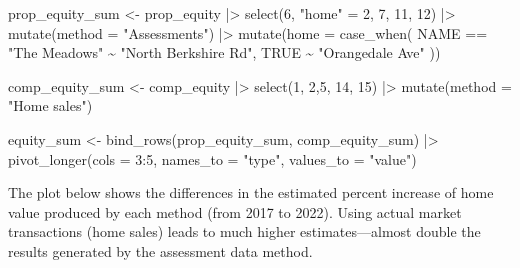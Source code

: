 \documentclass[
  letterpaper,
  DIV=11,
  numbers=noendperiod]{scrartcl}
\newenvironment{Shaded}{\begin{snugshade}}{\end{snugshade}}
\newcommand{\AttributeTok}[1]{\textcolor[rgb]{0.40,0.45,0.13}{#1}}
\newcommand{\ConstantTok}[1]{\textcolor[rgb]{0.56,0.35,0.01}{#1}}
\newcommand{\DecValTok}[1]{\textcolor[rgb]{0.68,0.00,0.00}{#1}}
\newcommand{\FunctionTok}[1]{\textcolor[rgb]{0.28,0.35,0.67}{#1}}
\newcommand{\NormalTok}[1]{\textcolor[rgb]{0.00,0.23,0.31}{#1}}
\newcommand{\OtherTok}[1]{\textcolor[rgb]{0.00,0.23,0.31}{#1}}
\newcommand{\SpecialCharTok}[1]{\textcolor[rgb]{0.37,0.37,0.37}{#1}}
\newcommand{\StringTok}[1]{\textcolor[rgb]{0.13,0.47,0.30}{#1}}
\begin{document}
\begin{Shaded}
\begin{Highlighting}[]
\NormalTok{prop\_equity\_sum }\OtherTok{\textless{}{-}}\NormalTok{ prop\_equity }\SpecialCharTok{|\textgreater{}} 
  \FunctionTok{select}\NormalTok{(}\DecValTok{6}\NormalTok{, }\StringTok{"home"} \OtherTok{=} \DecValTok{2}\NormalTok{, }\DecValTok{7}\NormalTok{, }\DecValTok{11}\NormalTok{, }\DecValTok{12}\NormalTok{) }\SpecialCharTok{|\textgreater{}} 
  \FunctionTok{mutate}\NormalTok{(}\AttributeTok{method =} \StringTok{"Assessments"}\NormalTok{) }\SpecialCharTok{|\textgreater{}} 
  \FunctionTok{mutate}\NormalTok{(}\AttributeTok{home =} \FunctionTok{case\_when}\NormalTok{(}
\NormalTok{    NAME }\SpecialCharTok{==} \StringTok{"The Meadows"} \SpecialCharTok{\textasciitilde{}} \StringTok{"North Berkshire Rd"}\NormalTok{,}
    \ConstantTok{TRUE} \SpecialCharTok{\textasciitilde{}} \StringTok{"Orangedale Ave"}
\NormalTok{  ))}

\NormalTok{comp\_equity\_sum }\OtherTok{\textless{}{-}}\NormalTok{ comp\_equity }\SpecialCharTok{|\textgreater{}} 
  \FunctionTok{select}\NormalTok{(}\DecValTok{1}\NormalTok{, }\DecValTok{2}\NormalTok{,}\DecValTok{5}\NormalTok{, }\DecValTok{14}\NormalTok{, }\DecValTok{15}\NormalTok{) }\SpecialCharTok{|\textgreater{}} 
  \FunctionTok{mutate}\NormalTok{(}\AttributeTok{method =} \StringTok{"Home sales"}\NormalTok{)}

\NormalTok{equity\_sum }\OtherTok{\textless{}{-}} \FunctionTok{bind\_rows}\NormalTok{(prop\_equity\_sum, comp\_equity\_sum) }\SpecialCharTok{|\textgreater{}} 
  \FunctionTok{pivot\_longer}\NormalTok{(}\AttributeTok{cols =} \DecValTok{3}\SpecialCharTok{:}\DecValTok{5}\NormalTok{, }\AttributeTok{names\_to =} \StringTok{"type"}\NormalTok{, }\AttributeTok{values\_to =} \StringTok{"value"}\NormalTok{)}
\end{Highlighting}
\end{Shaded}

The plot below shows the differences in the estimated percent increase
of home value produced by each method (from 2017 to 2022). Using actual
market transactions (home sales) leads to much higher estimates---almost
double the results generated by the assessment data method.
\end{document}
